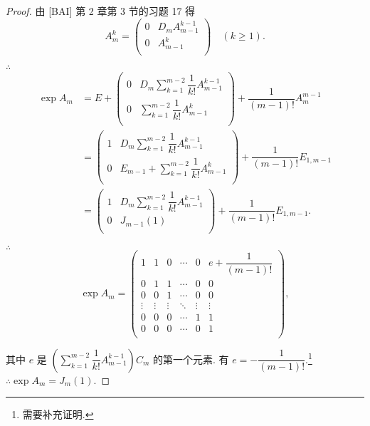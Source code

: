 \documentclass[color=black,device=normal,lang=cn,mode=geye]{elegantnote}
\begin{document}
\begin{proof}
    由 [BAI] 第 2 章第 3 节的习题 17 得
    \[A_m^k=\begin{pmatrix}
        0 & D_mA_{m-1}^{k-1} \\
        0 & A_{m-1}^k \\
    \end{pmatrix}\quad(k\geq1).\]

    $\therefore$
    \begin{align*}
        \exp A_m & =E+\begin{pmatrix}
            0 & D_m\sum\limits_{k=1}^{m-2}\dfrac{1}{k!}A_{m-1}^{k-1} \\
            0 & \sum\limits_{k=1}^{m-2}\dfrac{1}{k!}A_{m-1}^k \\
        \end{pmatrix}+\dfrac{1}{(m-1)!}A_m^{m-1} \\
        & =\begin{pmatrix}
            1 & D_m\sum\limits_{k=1}^{m-2}\dfrac{1}{k!}A_{m-1}^{k-1} \\
            0 & E_{m-1}+\sum\limits_{k=1}^{m-2}\dfrac{1}{k!}A_{m-1}^k \\
        \end{pmatrix}+\dfrac{1}{(m-1)!}E_{1,m-1} \\
        & =\begin{pmatrix}
            1 & D_m\sum\limits_{k=1}^{m-2}\dfrac{1}{k!}A_{m-1}^{k-1} \\
            0 & J_{m-1}(1) \\
        \end{pmatrix}+\dfrac{1}{(m-1)!}E_{1,m-1}.
    \end{align*}

    $\therefore$
    \[\exp A_m=\begin{pmatrix}
        1 & 1 & 0 & \cdots & 0 & e+\dfrac{1}{(m-1)!} \\
        0 & 1 & 1 & \cdots & 0 & 0 \\
        0 & 0 & 1 & \cdots & 0 & 0 \\
        \vdots & \vdots & \vdots & \ddots & \vdots & \vdots \\
        0 & 0 & 0 & \cdots & 1 & 1 \\
        0 & 0 & 0 & \cdots & 0 & 1 \\
    \end{pmatrix},\]

    其中 $e$ 是 $\left(\sum\limits_{k=1}^{m-2}\dfrac{1}{k!}A_{m-1}^{k-1}\right)C_m$ 的第一个元素. 有 $e=-\dfrac{1}{(m-1)!}$.\footnote{需要补充证明.} $\therefore\exp A_m=J_m(1)$.


\end{proof}
\end{document}
